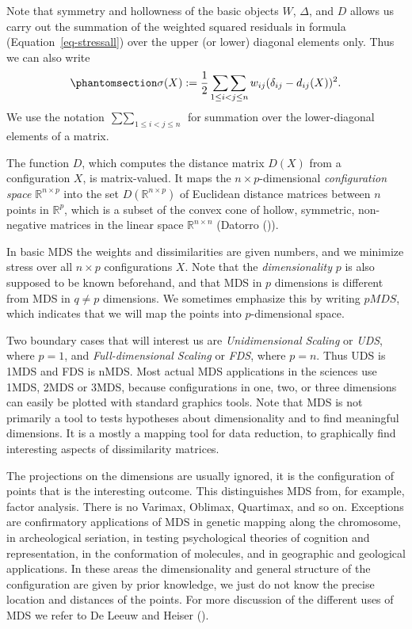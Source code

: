 \documentclass[
  12pt,
  letterpaper,
  DIV=11,
  numbers=noendperiod]{scrreprt}
\theoremstyle{remark}
\begin{document}
Note that symmetry and hollowness of the basic objects \(W\),
\(\Delta\), and \(D\) allows us carry out the summation of the weighted
squared residuals in formula (Equation~\ref{eq-stressall}) over the
upper (or lower) diagonal elements only. Thus we can also write
\begin{equation}\phantomsection\label{eq-stresshalf}{
\sigma(X):=\frac12\mathop{\sum\sum}_{1\leq i<j\leq n} w_{ij}(\delta_{ij}-d_{ij}(X))^2.
}\end{equation} We use the notation
\(\mathop{\sum\sum}_{1\leq i<j\leq n}\) for summation over the
lower-diagonal elements of a matrix.

The function \(D\), which computes the distance matrix \(D(X)\) from a
configuration \(X\), is matrix-valued. It maps the
\(n\times p\)-dimensional \emph{configuration space}
\(\mathbb{R}^{n\times p}\) into the set \(D(\mathbb{R}^{n\times p})\) of
Euclidean distance matrices between \(n\) points in \(\mathbb{R}^p\),
which is a subset of the convex cone of hollow, symmetric, non-negative
matrices in the linear space \(\mathbb{R}^{n\times n}\) (Datorro
()).

In basic MDS the weights and dissimilarities are given numbers, and we
minimize stress over all \(n\times p\) configurations \(X\). Note that
the \emph{dimensionality} \(p\) is also supposed to be known beforehand,
and that MDS in \(p\) dimensions is different from MDS in \(q\not= p\)
dimensions. We sometimes emphasize this by writing \(pMDS\), which
indicates that we will map the points into \(p\)-dimensional space.

Two boundary cases that will interest us are \emph{Unidimensional
Scaling} or \emph{UDS}, where \(p=1\), and \emph{Full-dimensional
Scaling} or \emph{FDS}, where \(p=n\). Thus UDS is 1MDS and FDS is nMDS.
Most actual MDS applications in the sciences use 1MDS, 2MDS or 3MDS,
because configurations in one, two, or three dimensions can easily be
plotted with standard graphics tools. Note that MDS is not primarily a
tool to tests hypotheses about dimensionality and to find meaningful
dimensions. It is a mostly a mapping tool for data reduction, to
graphically find interesting aspects of dissimilarity matrices.

The projections on the dimensions are usually ignored, it is the
configuration of points that is the interesting outcome. This
distinguishes MDS from, for example, factor analysis. There is no
Varimax, Oblimax, Quartimax, and so on. Exceptions are confirmatory
applications of MDS in genetic mapping along the chromosome, in
archeological seriation, in testing psychological theories of cognition
and representation, in the conformation of molecules, and in geographic
and geological applications. In these areas the dimensionality and
general structure of the configuration are given by prior knowledge, we
just do not know the precise location and distances of the points. For
more discussion of the different uses of MDS we refer to De Leeuw and
Heiser ().
\end{document}
